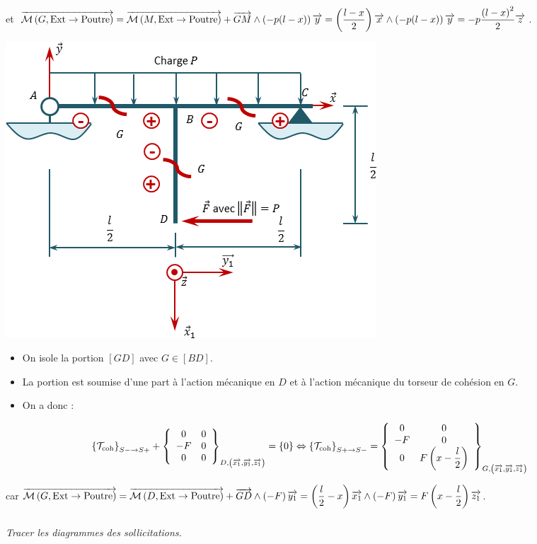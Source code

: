 \documentclass[10pt,fleqn]{article} %
\begin{document}
\begin{multicols}{1}
\begin{corrige}
et 
$\vectm{G}{\text{Ext}}{\text{Poutre}}
=  \vectm{M}{\text{Ext}}{\text{Poutre}} + \vect{GM}\wedge \left( -p(l-x) \right) \vect{y}  
= \left(\dfrac{l-x}{2}\right)\vect{x}\wedge \left(-p(l-x)\right) \vect{y}  
=  -p\dfrac{\left(l-x\right)^2}{2}\vect{z}  
$.

\begin{center}
\includegraphics[width=.45\linewidth]{images/exo_03_corr_02}
\end{center}

\begin{itemize}[label=,font=\color{ocre}] 
\item On isole la portion $[GD]$ avec $G\in [BD]$.
\item La portion est soumise d'une part à l'action mécanique en $D$ et à l'action mécanique du torseur de cohésion en $G$.
\item On a donc : 
\end{itemize}
$$
\torseurscoh_{S-\rightarrow S+} +
 \torseurcol{0}{-F}{0}{0}{0}{0}{D,\left( \vect{x_1},\vect{y_1},\vect{z_1} \right)} 
 = \{0\}
 \Leftrightarrow
\torseurscoh_{S+\rightarrow S-} =
 \torseurcol{0}{-F}{0}{0}{0}{F \left(x-\dfrac{l}{2}\right) }{G,\left( \vect{x_1},\vect{y_1},\vect{z_1} \right)}  
$$

car
$\vectm{G}{\text{Ext}}{\text{Poutre}}
=  \vectm{D}{\text{Ext}}{\text{Poutre}} + \vect{GD}\wedge \left(-F \right) \vect{y_1}  
= \left(\dfrac{l}{2}-x\right)\vect{x_1}\wedge \left(-F\right) \vect{y_1}  
=F \left(x-\dfrac{l}{2}\right)  \vect{z_1}  
$.


\end{corrige}
\else 
\fi

\subparagraph{}
\textit{Tracer les diagrammes des sollicitations.}
\ifprof
\begin{corrige}~\\


\end{corrige}
\end{multicols}
\end{document}
